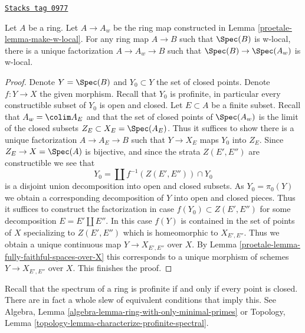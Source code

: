 \begin{lemma}

\label{proetale-lemma-universal}
\href{https://stacks.math.columbia.edu/tag/0977}{\texttt{Stacks tag 0977}}

Let $A$ be a ring. Let $A \to A_w$ be the ring map constructed in
Lemma \ref{proetale-lemma-make-w-local}. For any ring map $A \to B$ such that
$\Spec(B)$ is w-local, there is a unique factorization $A \to A_w \to B$
such that $\Spec(B) \to \Spec(A_w)$ is w-local.
\end{lemma}

\begin{proof}

Denote $Y = \Spec(B)$ and $Y_0 \subset Y$ the set of closed points.
Denote $f : Y \to X$ the given morphism.
Recall that $Y_0$ is profinite, in particular every constructible
subset of $Y_0$ is open and closed. Let $E \subset A$ be a finite subset.
Recall that $A_w = \colim A_E$ and that the set of closed points of
$\Spec(A_w)$ is the limit of the closed subsets $Z_E \subset X_E = \Spec(A_E)$.
Thus it suffices to show there is a unique factorization $A \to A_E \to B$
such that $Y \to X_E$ maps $Y_0$ into $Z_E$.
Since $Z_E \to X = \Spec(A)$ is bijective, and since the strata
$Z(E', E'')$ are constructible we see that
$$
Y_0 = \coprod f^{-1}(Z(E', E'')) \cap Y_0
$$
is a disjoint union decomposition into open and closed subsets.
As $Y_0 = \pi_0(Y)$ we obtain a corresponding decomposition of
$Y$ into open and closed pieces. Thus it suffices to construct
the factorization in case $f(Y_0) \subset Z(E', E'')$ for
some decomposition $E = E' \amalg E''$.
In this case $f(Y)$ is contained in the set of points of $X$
specializing to $Z(E', E'')$ which is homeomorphic to $X_{E', E''}$.
Thus we obtain a unique continuous map $Y \to X_{E', E''}$ over $X$. By
Lemma \ref{proetale-lemma-fully-faithful-spaces-over-X}
this corresponds to a unique morphism of schemes
$Y \to X_{E', E''}$ over $X$. This finishes the proof.
\end{proof}

Recall that the spectrum of a ring is profinite if and only if
every point is closed. There are in fact a whole slew of equivalent
conditions that imply this. See
Algebra, Lemma \ref{algebra-lemma-ring-with-only-minimal-primes} or
Topology, Lemma \ref{topology-lemma-characterize-profinite-spectral}.

